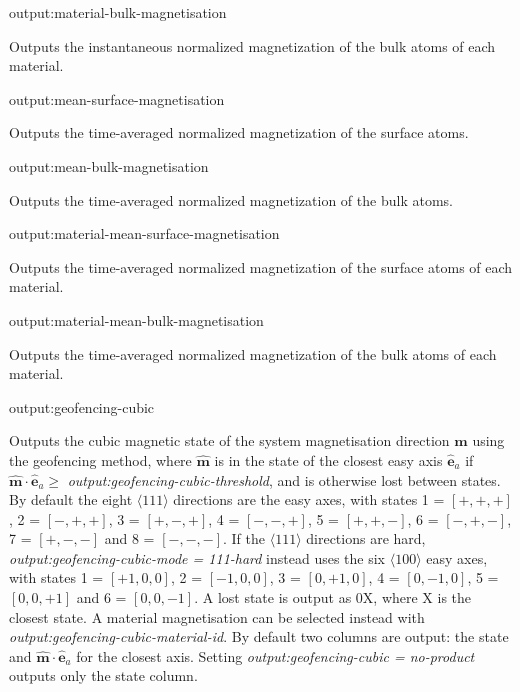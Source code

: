 {\zicf output:material-bulk-magnetisation} Outputs the instantaneous normalized magnetization of the bulk atoms of each material.

{\zicf output:mean-surface-magnetisation} Outputs the time-averaged normalized magnetization of the surface atoms.

{\zicf output:mean-bulk-magnetisation} Outputs the time-averaged normalized magnetization of the bulk atoms.

{\zicf output:material-mean-surface-magnetisation} Outputs the time-averaged normalized magnetization of the surface atoms of each material.

{\zicf output:material-mean-bulk-magnetisation} Outputs the time-averaged normalized magnetization of the bulk atoms of each material.

{\zicf output:geofencing-cubic} Outputs the cubic magnetic state of the system magnetisation direction $\hat{\mathbf{m}}$ using the geofencing method, where $\hat{\mathbf{m}}$ is in the state of the closest easy axis $\hat{\mathbf{e}}_a$ if $\hat{\mathbf{m}}\cdot\hat{\mathbf{e}}_a \ge$ \textit{output:geofencing-cubic-threshold}, and is otherwise lost between states. By default the eight $\langle 111 \rangle$ directions are the easy axes, with states 1 = $[+,+,+]$, 2 = $[-,+,+]$, 3 = $[+,-,+]$, 4 = $[-,-,+]$, 5 = $[+,+,-]$, 6 = $[-,+,-]$, 7 = $[+,-,-]$ and 8 = $[-,-,-]$. If the $\langle 111 \rangle$ directions are hard, \textit{output:geofencing-cubic-mode = 111-hard} instead uses the six $\langle 100 \rangle$ easy axes, with states 1 = $[+1,0,0]$, 2 = $[-1,0,0]$, 3 = $[0,+1,0]$, 4 = $[0,-1,0]$, 5 = $[0,0,+1]$ and 6 = $[0,0,-1]$. A lost state is output as 0X, where X is the closest state. A material magnetisation can be selected instead with \textit{output:geofencing-cubic-material-id}. By default two columns are output: the state and $\hat{\mathbf{m}}\cdot\hat{\mathbf{e}}_a$ for the closest axis. Setting \textit{output:geofencing-cubic = no-product} outputs only the state column.

